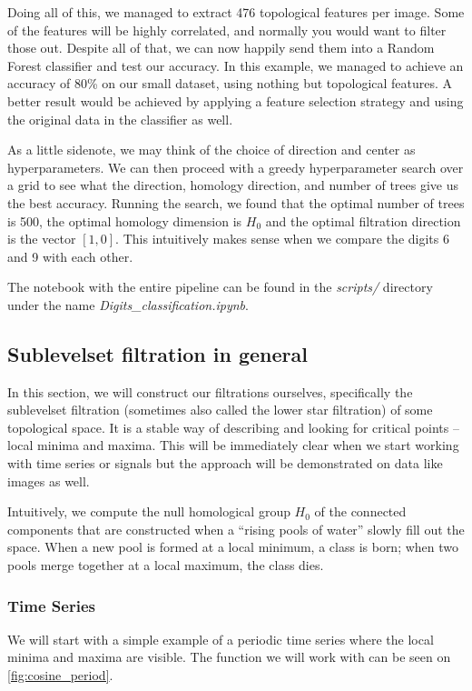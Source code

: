 Doing all of this, we managed to extract 476 topological features per image. Some of the features will be highly correlated, and normally you would want to filter those out. Despite all of that, we can now happily send them into a Random Forest classifier and test our accuracy. In this example, we managed to achieve an accuracy of 80\% on our small dataset, using nothing but topological features. A better result would be achieved by applying a feature selection strategy and using the original data in the classifier as well.

As a little sidenote, we may think of the choice of direction and center as hyperparameters. We can then proceed with a greedy hyperparameter search over a grid to see what the direction, homology direction, and number of trees give us the best accuracy. Running the search, we found that the optimal number of trees is 500, the optimal homology dimension is $H_{0}$ and the optimal filtration direction is the vector $[1, 0]$. This intuitively makes sense when we compare the digits 6 and 9 with each other.

The notebook with the entire pipeline can be found in the \textit{scripts/} directory under the name \textit{Digits\_classification.ipynb}.

\subsection{Sublevelset filtration in general}
In this section, we will construct our filtrations ourselves, specifically the sublevelset filtration (sometimes also called the lower star filtration) of some topological space. It is a stable way of describing and looking for critical points -- local minima and maxima. This will be immediately clear when we start working with time series or signals but the approach will be demonstrated on data like images as well.

Intuitively, we compute the null homological group $H_{0}$ of the connected components that are constructed when a ``rising pools of water'' slowly fill out the space. When a new pool is formed at a local minimum, a class is born; when two pools merge together at a local maximum, the class dies.

\subsubsection{Time Series}
We will start with a simple example of a periodic time series where the local minima and maxima are visible. The function we will work with can be seen on \ref{fig:cosine_period}.

